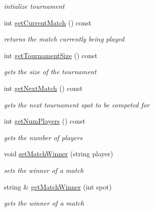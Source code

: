 \begin{DoxyCompactItemize}
\begin{DoxyCompactList}\small\item\em intialize tournament \item\end{DoxyCompactList}\item 
int \hyperlink{classTournament_ac33ed6461f737d97b0f00eb4f8ee5e10}{getCurrentMatch} () const 
\begin{DoxyCompactList}\small\item\em returns the match currently being played \item\end{DoxyCompactList}\item 
int \hyperlink{classTournament_a89b96072f94fb1393f91b026e5c42665}{getTournamentSize} () const 
\begin{DoxyCompactList}\small\item\em gets the size of the tournament \item\end{DoxyCompactList}\item 
int \hyperlink{classTournament_a3297fe5ad9a08392d8122bacb5bcf840}{getNextMatch} () const 
\begin{DoxyCompactList}\small\item\em gets the next tournament spot to be competed for \item\end{DoxyCompactList}\item 
int \hyperlink{classTournament_aedbd40e56f31c1b82e6220a0ee167ea7}{getNumPlayers} () const 
\begin{DoxyCompactList}\small\item\em gets the number of players \item\end{DoxyCompactList}\item 
void \hyperlink{classTournament_afe626f769c595b0ea1004fbc2220194d}{setMatchWinner} (string player)
\begin{DoxyCompactList}\small\item\em sets the winner of a match \item\end{DoxyCompactList}\item 
string \& \hyperlink{classTournament_a901b93c3122918e646a3c8f5625b4681}{getMatchWinner} (int spot)
\begin{DoxyCompactList}\small\item\em gets the winner of a match \item\end{DoxyCompactList}\end{DoxyCompactItemize}


